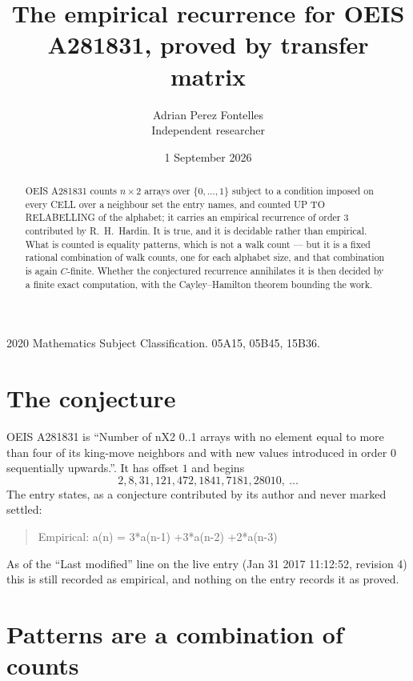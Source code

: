 \documentclass[11pt,a4paper]{article}
\title{The empirical recurrence for OEIS A281831, proved by transfer matrix}
\author{Adrian Perez Fontelles\\ \small Independent researcher}
\date{1 September 2026}
\theoremstyle{plain}
\theoremstyle{definition}
\begin{document}
\maketitle

\begin{abstract}
OEIS A281831 counts $n\times2$ arrays over $\{0,\dots,1\}$ subject to a condition imposed on
every CELL over a neighbour set the entry names, and counted UP TO RELABELLING of the
alphabet; it carries an empirical recurrence of order $3$ contributed by
R.~H.~Hardin. It is true, and it is decidable rather than empirical. What is counted is
equality patterns, which is not a walk count --- but it is a fixed rational combination of
walk counts, one for each alphabet size, and that combination is again $C$-finite. Whether the
conjectured recurrence annihilates it is then decided by a finite exact computation, with the
Cayley--Hamilton theorem bounding the work.
\end{abstract}

\noindent\small 2020 Mathematics Subject Classification. 05A15, 05B45, 15B36.\normalsize

\section{The conjecture}

OEIS A281831 is ``Number of nX2 0..1 arrays with no element equal to more than four of its king-move neighbors and with new values introduced in order 0 sequentially upwards.''. It has offset $1$ and begins
\[
2, 8, 31, 121, 472, 1841, 7181, 28010,\ \dots
\]
The entry states, as a conjecture contributed by its author and never marked settled:
\begin{quote}
Empirical: a(n) = 3*a(n-1) +3*a(n-2) +2*a(n-3)
\end{quote}
As of the ``Last modified'' line on the live entry (Jan 31 2017 11:12:52, revision 4) this is still
recorded as empirical, and nothing on the entry records it as proved.

\section{Patterns are a combination of counts}
\end{document}

